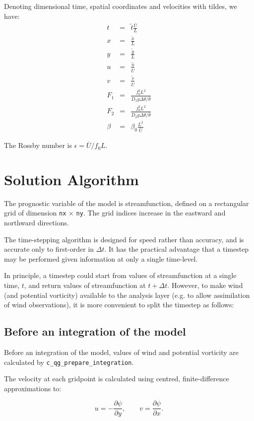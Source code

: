 \documentclass[12pt]{article}
\begin{document}
Denoting dimensional time, spatial coordinates and velocities with
tildes, we have:
\begin{eqnarray*}
t &=& \tilde t \frac{\overline U}{L} \\
x &=& \frac{\tilde x}{L} \\
y &=& \frac{\tilde y}{L} \\
u &=& \frac{\tilde u}{\overline U} \\
v &=& \frac{\tilde v}{\overline U} \\
F_1 &=& \frac{f_0^2 L^2}{D_1 g \Delta\theta / {\overline\theta}} \\
F_2 &=& \frac{f_0^2 L^2}{D_2 g \Delta\theta / {\overline\theta}} \\
\beta &=& \beta_0 \frac{L^2}{\overline U}
\end{eqnarray*}

The Rossby number is $\epsilon = {\overline U} / f_0 L$.

\section{Solution Algorithm}
The prognostic variable of the model is streamfunction, defined on a
rectangular grid of dimension {\tt nx} $\times$ {\tt ny}.
The grid indices increase in the eastward and northward directions.

The time-stepping algorithm is designed for speed rather than accuracy,
and is accurate only to first-order in $\Delta t$. It has the practical
advantage that a timestep may be performed given information at only a
single time-level.

In principle, a timestep could start from values of streamfunction at a
single time, $t$, and return values of streamfunction at $t+\Delta t$.
However, to make wind (and potential vorticity) available to the
analysis layer (e.g. to allow assimilation of wind observations), it is
more convenient to split the timestep as follows:

\subsection{Before an integration of the model}

Before an integration of the model, values of wind and potential
vorticity are calculated by {\tt c\_qg\_prepare\_integration}.

The velocity at each gridpoint is calculated using centred,
finite-difference approximations to:

\begin{equation}
u = -\frac{\partial \psi}{\partial y} ,\qquad
v =  \frac{\partial \psi}{\partial x} .
\end{equation}
\end{document}
